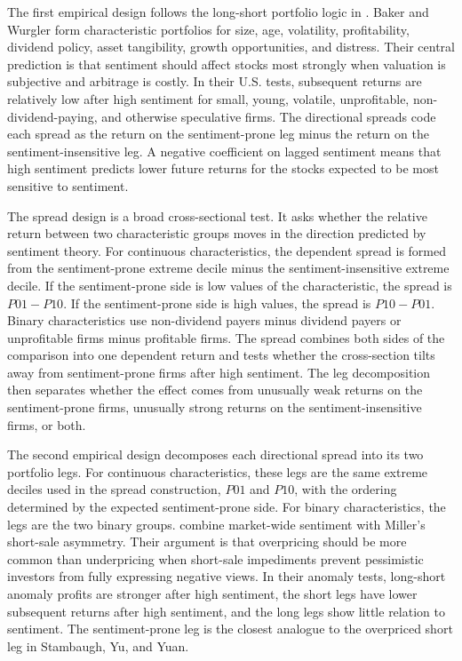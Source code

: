 \documentclass[11pt]{article}
\newcommand{\var}[1]{\ensuremath{#1}}
\begin{document}
The first empirical design follows the long-short portfolio logic in \citet{baker2006sentiment}. Baker and Wurgler form characteristic portfolios for size, age, volatility, profitability, dividend policy, asset tangibility, growth opportunities, and distress. Their central prediction is that sentiment should affect stocks most strongly when valuation is subjective and arbitrage is costly. In their U.S. tests, subsequent returns are relatively low after high sentiment for small, young, volatile, unprofitable, non-dividend-paying, and otherwise speculative firms. The directional spreads code each spread as the return on the sentiment-prone leg minus the return on the sentiment-insensitive leg. A negative coefficient on lagged sentiment means that high sentiment predicts lower future returns for the stocks expected to be most sensitive to sentiment.

The spread design is a broad cross-sectional test. It asks whether the relative return between two characteristic groups moves in the direction predicted by sentiment theory. For continuous characteristics, the dependent spread is formed from the sentiment-prone extreme decile minus the sentiment-insensitive extreme decile. If the sentiment-prone side is low values of the characteristic, the spread is \var{P01-P10}. If the sentiment-prone side is high values, the spread is \var{P10-P01}. Binary characteristics use non-dividend payers minus dividend payers or unprofitable firms minus profitable firms. The spread combines both sides of the comparison into one dependent return and tests whether the cross-section tilts away from sentiment-prone firms after high sentiment. The leg decomposition then separates whether the effect comes from unusually weak returns on the sentiment-prone firms, unusually strong returns on the sentiment-insensitive firms, or both.

The second empirical design decomposes each directional spread into its two portfolio legs. For continuous characteristics, these legs are the same extreme deciles used in the spread construction, \var{P01} and \var{P10}, with the ordering determined by the expected sentiment-prone side. For binary characteristics, the legs are the two binary groups. \citet{stambaugh2012short} combine market-wide sentiment with Miller's short-sale asymmetry. Their argument is that overpricing should be more common than underpricing when short-sale impediments prevent pessimistic investors from fully expressing negative views. In their anomaly tests, long-short anomaly profits are stronger after high sentiment, the short legs have lower subsequent returns after high sentiment, and the long legs show little relation to sentiment. The sentiment-prone leg is the closest analogue to the overpriced short leg in Stambaugh, Yu, and Yuan.
\end{document}
